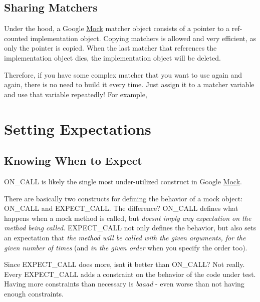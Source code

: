 \subsection*{Sharing Matchers}

Under the hood, a Google \mbox{\hyperlink{class_mock}{Mock}} matcher object consists of a pointer to a ref-\/counted implementation object. Copying matchers is allowed and very efficient, as only the pointer is copied. When the last matcher that references the implementation object dies, the implementation object will be deleted.

Therefore, if you have some complex matcher that you want to use again and again, there is no need to build it every time. Just assign it to a matcher variable and use that variable repeatedly! For example,


\begin{DoxyCode}{0}
\end{DoxyCode}


\section*{Setting Expectations}

\subsection*{Knowing When to Expect}

{\ttfamily O\+N\+\_\+\+C\+A\+LL} is likely the single most under-\/utilized construct in Google \mbox{\hyperlink{class_mock}{Mock}}.

There are basically two constructs for defining the behavior of a mock object\+: {\ttfamily O\+N\+\_\+\+C\+A\+LL} and {\ttfamily E\+X\+P\+E\+C\+T\+\_\+\+C\+A\+LL}. The difference? {\ttfamily O\+N\+\_\+\+C\+A\+LL} defines what happens when a mock method is called, but {\itshape doesn\textquotesingle{}t imply any expectation on the method being called.} {\ttfamily E\+X\+P\+E\+C\+T\+\_\+\+C\+A\+LL} not only defines the behavior, but also sets an expectation that {\itshape the method will be called with the given arguments, for the given number of times} (and {\itshape in the given order} when you specify the order too).

Since {\ttfamily E\+X\+P\+E\+C\+T\+\_\+\+C\+A\+LL} does more, isn\textquotesingle{}t it better than {\ttfamily O\+N\+\_\+\+C\+A\+LL}? Not really. Every {\ttfamily E\+X\+P\+E\+C\+T\+\_\+\+C\+A\+LL} adds a constraint on the behavior of the code under test. Having more constraints than necessary is {\itshape baaad} -\/ even worse than not having enough constraints.


